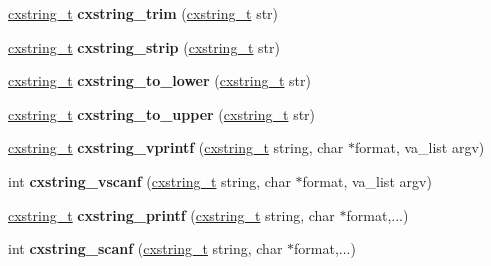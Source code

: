 \begin{DoxyCompactItemize}
\hyperlink{a00072}{cxstring\+\_\+t} {\bfseries cxstring\+\_\+trim} (\hyperlink{a00072}{cxstring\+\_\+t} str)
\item 
\mbox{\label{a00026_ac1b5285b5a64bfd1974b906bf00b04f9}} 
\hyperlink{a00072}{cxstring\+\_\+t} {\bfseries cxstring\+\_\+strip} (\hyperlink{a00072}{cxstring\+\_\+t} str)
\item 
\mbox{\label{a00026_a05d7cb78f4e113701f7ebff39643375d}} 
\hyperlink{a00072}{cxstring\+\_\+t} {\bfseries cxstring\+\_\+to\+\_\+lower} (\hyperlink{a00072}{cxstring\+\_\+t} str)
\item 
\mbox{\label{a00026_aabaffed8700bf2131926aa76ed1c6cdd}} 
\hyperlink{a00072}{cxstring\+\_\+t} {\bfseries cxstring\+\_\+to\+\_\+upper} (\hyperlink{a00072}{cxstring\+\_\+t} str)
\item 
\mbox{\label{a00026_a4663bed5e303176831f983df6667d76f}} 
\hyperlink{a00072}{cxstring\+\_\+t} {\bfseries cxstring\+\_\+vprintf} (\hyperlink{a00072}{cxstring\+\_\+t} string, char $\ast$format, va\+\_\+list argv)
\item 
\mbox{\label{a00026_a7759b8e61f6a384ce0981813a939bbd4}} 
int {\bfseries cxstring\+\_\+vscanf} (\hyperlink{a00072}{cxstring\+\_\+t} string, char $\ast$format, va\+\_\+list argv)
\item 
\mbox{\label{a00026_a8099e18ca92bf5534cb2142aa2c4cdb9}} 
\hyperlink{a00072}{cxstring\+\_\+t} {\bfseries cxstring\+\_\+printf} (\hyperlink{a00072}{cxstring\+\_\+t} string, char $\ast$format,...)
\item 
\mbox{\label{a00026_a522ebdda1052895d963693f5ed156f71}} 
int {\bfseries cxstring\+\_\+scanf} (\hyperlink{a00072}{cxstring\+\_\+t} string, char $\ast$format,...)
\end{DoxyCompactItemize}
